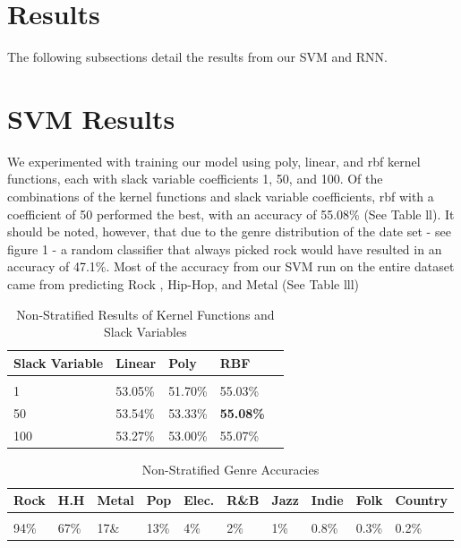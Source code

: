 \documentclass[journal]{IEEEtran}
\begin{document}
\section{Results}

The following subsections detail the results from our SVM and RNN.

\section{SVM Results}

We experimented with training our model using poly, linear, and rbf kernel functions, each with slack variable coefficients 1, 50, and 100. Of the combinations of the  kernel functions and slack variable coefficients, rbf with a coefficient of 50 performed the best, with an accuracy of 55.08\% (See Table ll). It should be noted, however, that due to the genre distribution of the date set - see figure 1 - a random classifier that always picked rock would have resulted in an accuracy of 47.1\%. Most of the accuracy from our SVM run on the entire dataset came from predicting Rock , Hip-Hop, and Metal (See Table lll)


\begin{table}[h!]
    \label{tab:table1}
    \caption{Non-Stratified Results of Kernel Functions and Slack Variables}
    \begin{tabular}{l|l|l|ll}
      \textbf{Slack Variable} & \textbf{Linear} & \textbf{Poly} & \textbf{RBF}\\

      \hline
      \\
	1 & 53.05\% & 51.70\% & 55.03\%\\
	50 & 53.54\% & 53.33\% & \textbf{55.08\%}\\
	100 & 53.27\% & 53.00\% & 55.07\%\\

    \end{tabular}
\end{table}

\begin{table}[h!]
    \label{tab:table1}
    \caption{Non-Stratified Genre Accuracies}
    \begin{tabular}{|m{0.4cm}|m{0.4cm}|m{0.5cm}|m{0.45cm}|m{0.4cm}|m{0.4cm}|m{0.45cm}|m{0.4cm}|m{0.4cm}|m{0.4cm}}
    \textbf{Rock} & \textbf{H.H} & \textbf{Metal} & \textbf{Pop} & \textbf{Elec.} & \textbf{R\&B} & \textbf{Jazz} & \textbf{Indie} & \textbf{Folk} & \textbf{Country}\\
      \hline
      \\
	94\% & 67\% & 17\& & 13\% & 4\% & 2\% & 1\% & 0.8\% & 0.3\% & 0.2\%\\

    \end{tabular}
\end{table}
\end{document}
